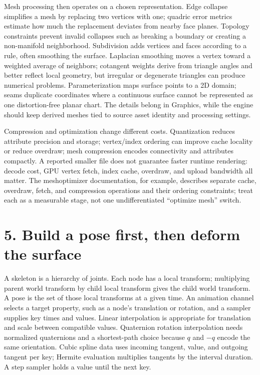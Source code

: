 Mesh processing then operates on a chosen representation. Edge collapse simplifies a mesh by replacing two vertices with one; quadric error metrics estimate how much the replacement deviates from nearby face planes. Topology constraints prevent invalid collapses such as breaking a boundary or creating a non-manifold neighborhood. Subdivision adds vertices and faces according to a rule, often smoothing the surface. Laplacian smoothing moves a vertex toward a weighted average of neighbors; cotangent weights derive from triangle angles and better reflect local geometry, but irregular or degenerate triangles can produce numerical problems. Parameterization maps surface points to a 2D domain; seams duplicate coordinates where a continuous surface cannot be represented as one distortion-free planar chart. The details belong in Graphics, while the engine should keep derived meshes tied to source asset identity and processing settings.

Compression and optimization change different costs. Quantization reduces attribute precision and storage; vertex/index ordering can improve cache locality or reduce overdraw; mesh compression encodes connectivity and attributes compactly. A reported smaller file does not guarantee faster runtime rendering: decode cost, GPU vertex fetch, index cache, overdraw, and upload bandwidth all matter. The meshoptimizer documentation, for example, describes separate cache, overdraw, fetch, and compression operations and their ordering constraints; treat each as a measurable stage, not one undifferentiated ``optimize mesh'' switch.

\section{5. Build a pose first, then deform the surface}\label{04-visual-computing-ii-ch037-build-a-pose-first-then-deform-the-surface}

A skeleton is a hierarchy of joints. Each node has a local transform; multiplying parent world transform by child local transform gives the child world transform. A pose is the set of those local transforms at a given time. An animation channel selects a target property, such as a node's translation or rotation, and a sampler supplies key times and values. Linear interpolation is appropriate for translation and scale between compatible values. Quaternion rotation interpolation needs normalized quaternions and a shortest-path choice because \(q\) and \(-q\) encode the same orientation. Cubic spline data uses incoming tangent, value, and outgoing tangent per key; Hermite evaluation multiplies tangents by the interval duration. A step sampler holds a value until the next key.

